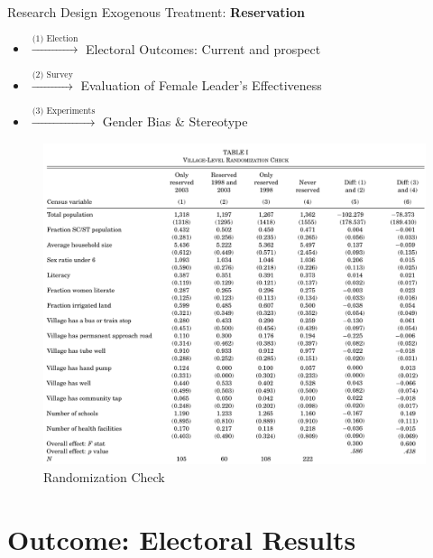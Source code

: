 \documentclass[
  10pt,
  ignorenonframetext,
  aspectratio=43,
]{beamer}
\providecommand{\tightlist}{%
  \setlength{\itemsep}{0pt}\setlength{\parskip}{0pt}}
\begin{document}
\begin{frame}{Research Design}
\protect\hypertarget{research-design}{}
Exogenous Treatment: \textbf{Reservation}

\begin{itemize}
\tightlist
\item
  \(\xrightarrow{\text{(1) Election}}\) Electoral Outcomes: Current and
  prospect
\item
  \(\xrightarrow{\text{(2) Survey}}\) Evaluation of Female Leader's
  Effectiveness
\item
  \(\xrightarrow{\text{(3) Experiments}}\) Gender Bias \& Stereotype
\end{itemize}
\end{frame}

\begin{frame}
\begin{figure}
\centering
\includegraphics{20220523-qje-beaman-duflo-powerful-women.assets/table1-randomization-check.png}
\caption{Randomization Check}
\end{figure}
\end{frame}

\hypertarget{outcome-electoral-results}{%
\section{Outcome: Electoral Results}\label{outcome-electoral-results}}
\end{document}
